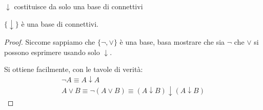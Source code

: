 \documentclass[aspectratio=169,10pt,dvipsnames,xcolor=table,handout]{beamer}
\begin{document}
\begin{frame}{$\downarrow$ costituisce da solo una base di connettivi}
    \begin{theorem}
        $\{ \downarrow \}$ è una base di connettivi.
    \end{theorem}
    \begin{proof}
     Siccome sappiamo che $\{\neg, \vee\}$ è una base, basa mostrare che sia $\neg$ che $\vee$ si possono esprimere usando solo $\downarrow$.

    \medskip
    Si ottiene facilmente, con le tavole di verità:
    \begin{gather*}
        \neg A \equiv A \downarrow A\\
        A \vee B \equiv \neg(A \vee B) \equiv (A \downarrow B) \downarrow (A \downarrow B)
    \end{gather*}
    \end{proof}
\end{frame}
\end{document}
